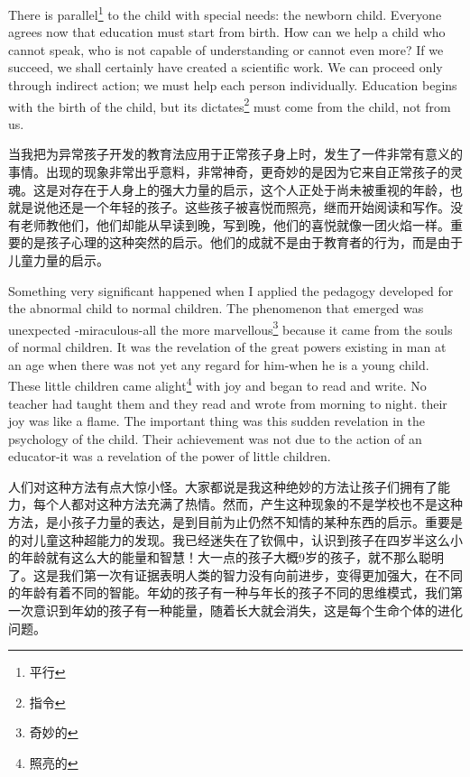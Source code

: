 \documentclass[lang=cn,10pt]{elegantbook}
\begin{document}
There is parallel\footnote{平行} to the child with special needs: the newborn child. Everyone agrees now that education must start from birth. How can we help a child who cannot speak, who is not capable of understanding or cannot even more? If we succeed, we shall certainly have created a scientific work. We can proceed only through indirect action; we must help each person individually. Education begins with the birth of the child, but its dictates\footnote{指令} must come from the child, not from us.

当我把为异常孩子开发的教育法应用于正常孩子身上时，发生了一件非常有意义的事情。出现的现象非常出乎意料，非常神奇，更奇妙的是因为它来自正常孩子的灵魂。这是对存在于人身上的强大力量的启示，这个人正处于尚未被重视的年龄，也就是说他还是一个年轻的孩子。这些孩子被喜悦而照亮，继而开始阅读和写作。没有老师教他们，他们却能从早读到晚，写到晚，他们的喜悦就像一团火焰一样。重要的是孩子心理的这种突然的启示。他们的成就不是由于教育者的行为，而是由于儿童力量的启示。

Something very significant happened when I applied the pedagogy developed for the abnormal child to normal children. The phenomenon that emerged was unexpected -miraculous-all the more marvellous\footnote{奇妙的} because it came from the souls of normal children. It was the revelation of the great powers existing in man at an age when there was not yet any regard for him-when he is a young child. These little children came alight\footnote{照亮的} with joy and began to read and write. No teacher had taught them and they read and wrote from morning to night. their joy was like a flame. The important thing was this sudden revelation in the psychology of the child. Their achievement was not due to the action of an educator-it was a revelation of the power of little children.

人们对这种方法有点大惊小怪。大家都说是我这种绝妙的方法让孩子们拥有了能力，每个人都对这种方法充满了热情。然而，产生这种现象的不是学校也不是这种方法，是小孩子力量的表达，是到目前为止仍然不知情的某种东西的启示。重要是的对儿童这种超能力的发现。我已经迷失在了钦佩中，认识到孩子在四岁半这么小的年龄就有这么大的能量和智慧！大一点的孩子大概9岁的孩子，就不那么聪明了。这是我们第一次有证据表明人类的智力没有向前进步，变得更加强大，在不同的年龄有着不同的智能。年幼的孩子有一种与年长的孩子不同的思维模式，我们第一次意识到年幼的孩子有一种能量，随着长大就会消失，这是每个生命个体的进化问题。
\end{document}
